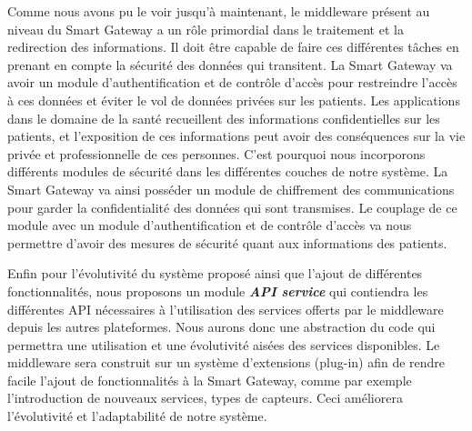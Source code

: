 Comme nous avons pu le voir jusqu’à maintenant, le middleware présent au niveau du Smart Gateway a un rôle primordial dans le traitement et la redirection des informations. Il doit être capable de faire ces différentes tâches en prenant en compte la sécurité des données qui transitent. La Smart Gateway va avoir un module d’authentification et de contrôle d’accès pour restreindre l’accès à ces données et éviter le vol de données privées sur les patients. Les applications dans le domaine de la santé recueillent des informations confidentielles sur les patients, et l’exposition de ces informations peut avoir des conséquences sur la vie privée et professionnelle de ces personnes. C’est pourquoi nous incorporons différents modules de sécurité dans les différentes couches de notre système. La Smart Gateway va ainsi posséder un module de chiffrement des communications pour garder la confidentialité des données qui sont transmises. Le couplage de ce module avec un module d’authentification et de contrôle d’accès va nous permettre d’avoir des mesures de sécurité quant aux informations des patients.

Enfin pour l’évolutivité du système proposé ainsi que l’ajout de différentes fonctionnalités, nous proposons un module \textbf{\textit{API service}} qui contiendra les différentes API nécessaires à l'utilisation des services offerts par le middleware depuis les autres plateformes. Nous aurons donc une abstraction du code qui permettra une utilisation et une évolutivité aisées des services disponibles.
Le middleware sera construit sur un système d'extensions (plug-in) afin de rendre facile l’ajout de fonctionnalités à la Smart Gateway, comme par exemple l’introduction de nouveaux services, types de capteurs. Ceci améliorera l'évolutivité et l'adaptabilité de notre système.

